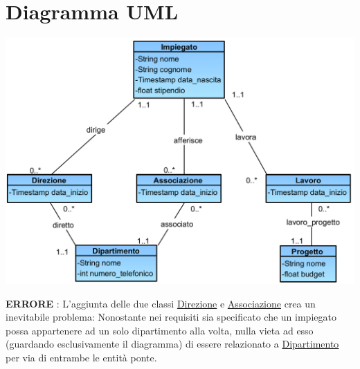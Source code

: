 \documentclass[12pt, letterpaper]{article}
\begin{document}
\section{Diagramma UML}
\begin{center}
    \includegraphics[width=1\textwidth ]{images/UML_visualParadigm.png}
\end{center}
\color{red} \textbf{ERRORE} : \color{black} L'aggiunta delle due classi \underline{Direzione}
e \underline{Associazione} crea un inevitabile problema: Nonostante nei requisiti sia specificato 
che un impiegato possa appartenere ad un solo dipartimento alla volta, nulla vieta ad esso 
(guardando esclusivamente il diagramma) di essere relazionato a \underline{Dipartimento} per 
via di entrambe le entità ponte.
\end{document}
